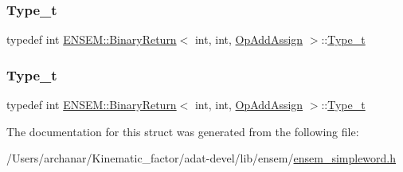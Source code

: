 \mbox{\label{structENSEM_1_1BinaryReturn_3_01int_00_01int_00_01OpAddAssign_01_4_a59ccfa49f2916c58be8fcfb51e252c15}} 
\subsubsection{\texorpdfstring{Type\_t}{Type\_t}\hspace{0.1cm}{\footnotesize\ttfamily [2/3]}}
{\footnotesize\ttfamily typedef int \mbox{\hyperlink{structENSEM_1_1BinaryReturn}{E\+N\+S\+E\+M\+::\+Binary\+Return}}$<$ int, int, \mbox{\hyperlink{structENSEM_1_1OpAddAssign}{Op\+Add\+Assign}} $>$\+::\mbox{\hyperlink{structENSEM_1_1BinaryReturn_3_01int_00_01int_00_01OpAddAssign_01_4_a59ccfa49f2916c58be8fcfb51e252c15}{Type\+\_\+t}}}

\mbox{\label{structENSEM_1_1BinaryReturn_3_01int_00_01int_00_01OpAddAssign_01_4_a59ccfa49f2916c58be8fcfb51e252c15}} 
\subsubsection{\texorpdfstring{Type\_t}{Type\_t}\hspace{0.1cm}{\footnotesize\ttfamily [3/3]}}
{\footnotesize\ttfamily typedef int \mbox{\hyperlink{structENSEM_1_1BinaryReturn}{E\+N\+S\+E\+M\+::\+Binary\+Return}}$<$ int, int, \mbox{\hyperlink{structENSEM_1_1OpAddAssign}{Op\+Add\+Assign}} $>$\+::\mbox{\hyperlink{structENSEM_1_1BinaryReturn_3_01int_00_01int_00_01OpAddAssign_01_4_a59ccfa49f2916c58be8fcfb51e252c15}{Type\+\_\+t}}}



The documentation for this struct was generated from the following file\+:\begin{DoxyCompactItemize}
\item 
/\+Users/archanar/\+Kinematic\+\_\+factor/adat-\/devel/lib/ensem/\mbox{\hyperlink{adat-devel_2lib_2ensem_2ensem__simpleword_8h}{ensem\+\_\+simpleword.\+h}}\end{DoxyCompactItemize}

